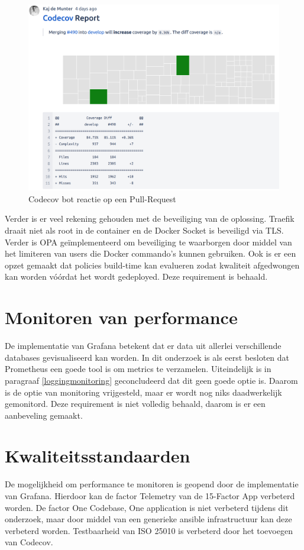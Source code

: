 \begin{figure}[H]
	\centering
	\includegraphics[width=13cm]{Figures/coverage}
	\decoRule
	\caption[Codecov bot]{Codecov bot reactie op een Pull-Request}
	\label{fig:coverage}
\end{figure}

Verder is er veel rekening gehouden met de beveiliging van de oplossing. Traefik draait niet als root in de container en de Docker Socket is beveiligd via TLS. Verder is OPA geïmplementeerd om beveiliging te waarborgen door middel van het limiteren van users die Docker commando's kunnen gebruiken. Ook is er een opzet gemaakt dat policies build-time kan evalueren zodat kwaliteit afgedwongen kan worden vóórdat het wordt gedeployed. Deze requirement is behaald.

\section{Monitoren van performance}

De implementatie van Grafana betekent dat er data uit allerlei verschillende databases gevisualiseerd kan worden. In dit onderzoek is als eerst besloten dat Prometheus een goede tool is om metrics te verzamelen. Uiteindelijk is in paragraaf \ref{loggingmonitoring} geconcludeerd dat dit geen goede optie is. Daarom is de optie van monitoring vrijgesteld, maar er wordt nog niks daadwerkelijk gemonitord. Deze requirement is niet volledig behaald, daarom is er een aanbeveling gemaakt.

\section{Kwaliteitsstandaarden}
De mogelijkheid om performance te monitoren is geopend door de implementatie van Grafana. Hierdoor kan de factor Telemetry van de 15-Factor App verbeterd worden. De factor One Codebase, One application is niet verbeterd tijdens dit onderzoek, maar door middel van een generieke ansible infrastructuur kan deze verbeterd worden. Testbaarheid van ISO 25010 is verbeterd door het toevoegen van Codecov. 

